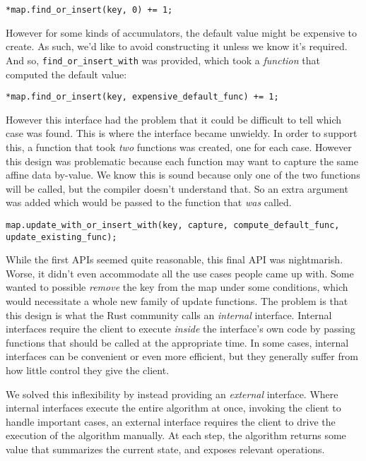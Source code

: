 \begin{verbatim}
*map.find_or_insert(key, 0) += 1;
\end{verbatim}

However for some kinds of accumulators, the default value might be expensive to
create. As such, we'd like to avoid constructing it unless we know it's required.
And so, \texttt{find_or_insert_with} was provided, which took a \emph{function} that computed
the default value:

\begin{verbatim}
*map.find_or_insert(key, expensive_default_func) += 1;
\end{verbatim}

However this interface had the problem that it could be difficult to tell which
case was found. This is where the interface became unwieldy. In order to support
this, a function that took \emph{two} functions was created, one for each case. However this
design was problematic because each function
may want to capture the same affine data by-value. We know this is sound because only
one of the two functions will be called, but the compiler doesn't understand that.
So an extra argument was added which would be passed to the function that \emph{was}
called.

\begin{verbatim}
map.update_with_or_insert_with(key, capture, compute_default_func, update_existing_func);
\end{verbatim}

While the first APIs seemed quite reasonable, this final API was nightmarish. Worse,
it didn't even accommodate all the use cases people came up with. Some wanted
to possible \emph{remove} the key from the map under some conditions, which would necessitate
a whole new family of update functions. The problem is that this design is what the
Rust community calls an \emph{internal} interface. Internal interfaces require the client
to execute \emph{inside} the interface's own code by passing functions that should be
called at the appropriate time. In some cases, internal interfaces can be convenient
or even more efficient, but they generally suffer from how little control they give
the client.

We solved this inflexibility by instead providing an \emph{external} interface. Where
internal interfaces execute the entire algorithm at once, invoking the client to
handle important cases, an external interface requires the client to drive the
execution of the algorithm manually. At each step, the algorithm returns some
value that summarizes the current state, and exposes relevant operations.

